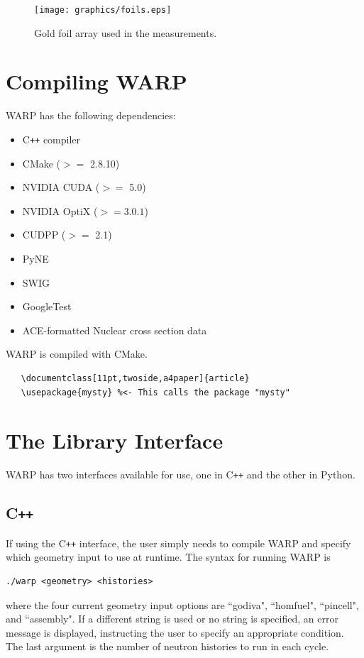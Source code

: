 \documentclass[twoside,a4paper]{refart}
\begin{document}
\begin{figure}[!htb]
   \centering
   \texttt{[image: graphics/foils.eps]}
   \caption{Gold foil array used in the measurements.}
   \label{foils}
\end{figure}

\section{Compiling WARP}

WARP has the following dependencies:
\begin{itemize}
	\item{C\texttt{++} compiler}
	\item{CMake ($>=$ 2.8.10)}
	\item{NVIDIA CUDA ($>=$ 5.0)}
	\item{NVIDIA OptiX ($>= 3.0.1$)}
	\item{CUDPP ($>=$ 2.1)}
	\item{PyNE}
	\item{SWIG}
	\item{GoogleTest}
	\item{ACE-formatted Nuclear cross section data}
\end{itemize}

WARP is compiled with CMake.

\begin{verbatim}
   \documentclass[11pt,twoside,a4paper]{article}
   \usepackage{mysty} %<- This calls the package "mysty"
\end{verbatim}


\section{The Library Interface}

WARP has two interfaces available for use, one in C\texttt{++} and the other in Python.

\subsection{C\texttt{++}}

If using the C\texttt{++} interface, the user simply needs to compile WARP and specify which geometry
input to use at runtime. The syntax for running WARP is

\begin{verbatim}
./warp <geometry> <histories>
\end{verbatim}

where the four current geometry input options are ``godiva", ``homfuel", ``pincell", and ``assembly". If 
a different string is used or no string is specified, an error message is displayed, instructing the 
user to specify an appropriate condition. The last argument is the number of neutron histories to run in 
each cycle.
\end{document}

